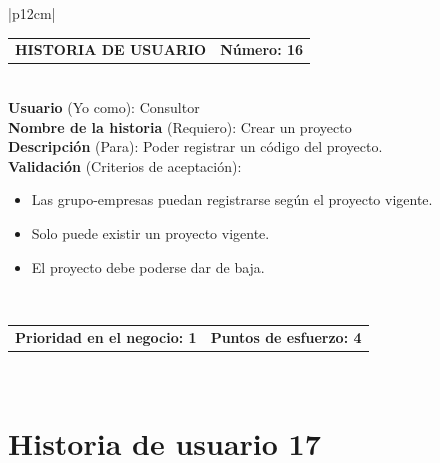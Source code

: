 \documentclass[11pt,letterpaper]{report}
\begin{document}
	\begin{center}	
		\begin{tabular}{|p{12cm}|}
			\hline
			\begin{tabular}{c|c}
				\textbf{HISTORIA DE USUARIO} & \textbf{Número: 16} \\
			\end{tabular} \\ \hline
			\textbf{Usuario} (Yo como): Consultor \\ \hline
			\textbf{Nombre de la historia} (Requiero): Crear un proyecto \\ \hline
			\textbf{Descripción} (Para): Poder registrar un código del proyecto. \\ \hline
			\textbf{Validación} (Criterios de aceptación): \\
			\begin{minipage}{12cm}
				\begin{itemize}
					\item Las grupo-empresas puedan registrarse según el proyecto vigente.
					\item Solo puede existir un proyecto vigente.
					\item El proyecto debe poderse dar de baja.
				\end{itemize}
			\end{minipage} \\ \hline
			\begin{tabular}{c|c}
				\textbf{Prioridad en el negocio: 1} & \textbf{Puntos de esfuerzo: 4} \\
			\end{tabular} \\ \hline
		\end{tabular}
	\end{center}
	
	\section{Historia de usuario 17}
	
\end{document}
